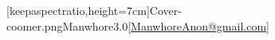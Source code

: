 \documentclass[a4paper,12pt,american,oneside,numbers=noenddot]{scrreprt} %
\begin{document}

[keepaspectratio,height=7cm]{Cover-coomer.png}{Manwhore}{3.0}[\href{mailto:ManwhoreAnon@gmail.com}{ManwhoreAnon@gmail.com}]

\tcolortoc



\printglossaries

\nocite{*}
\clearpage
\printbibliography[title={Bibliography}]
\clearpage




\end{document}
